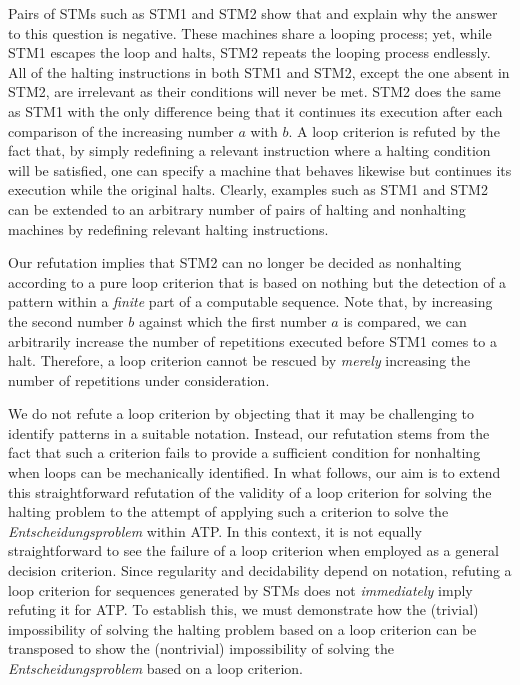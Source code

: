 \documentclass[%
  manuscript=article,   %
  year=2024,
  volume=77,
  doi=10.59203/zfn.77.694,
]{zfn}
\begin{document}
Pairs of STMs such as STM1 and STM2 show that and explain why the answer to this question is negative. 
These machines share a looping process; yet, while STM1 escapes the loop and halts, STM2 repeats the looping process endlessly. All of the halting instructions in both STM1 and STM2, except the one absent in STM2, are irrelevant as their conditions will never be met. STM2 does the same as STM1 with the only difference being that it continues its execution after each comparison of the increasing number $a$ with $b$.  A loop criterion is refuted by the fact that, by simply redefining a relevant instruction where a halting condition will be satisfied, one can specify a machine that behaves likewise but continues its execution while the original halts. Clearly, examples such as STM1 and STM2 can be extended to an arbitrary number of
pairs of halting and nonhalting machines by redefining relevant halting instructions.

Our refutation implies that STM2 can no longer be decided as nonhalting according to a pure loop criterion that is based on nothing but \label{assumption} the detection of a pattern within a \emph{finite} part of a computable sequence. Note that, by increasing the second number $b$ against which the first number $a$ is compared, we can arbitrarily increase the number of repetitions executed before STM1 comes to a halt. Therefore, a loop criterion cannot be rescued by \emph{merely} increasing the number of repetitions under consideration.

We do not refute a loop criterion by objecting that it may be challenging to identify patterns in a suitable notation. Instead, our refutation stems from the fact that such a criterion fails to provide a sufficient condition for nonhalting when loops can be mechanically identified. In what follows, our aim is to extend this straightforward refutation of the validity of a loop criterion for solving the halting problem to the attempt of applying such a criterion to solve the \emph{Entscheidungsproblem} within ATP. In this context, it is not equally straightforward to see the failure
of a loop criterion when employed as a general decision criterion.
Since regularity and decidability depend on notation, refuting a loop criterion for sequences generated by STMs does not \emph{immediately} imply refuting it for ATP. To establish this,
we must demonstrate how the (trivial) impossibility of solving the halting problem based on a loop criterion can be transposed to show the (nontrivial) impossibility of solving the \emph{Entscheidungsproblem} based on a loop criterion.
\end{document}
